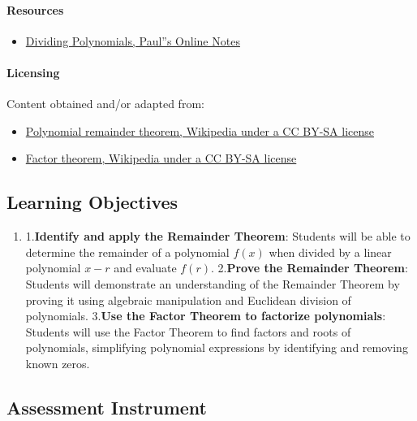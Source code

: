 \paragraph{Resources}

\begin{itemize}
    \item \href{https://tutorial.math.lamar.edu/classes/alg/dividingpolynomials.aspx}{Dividing Polynomials, Paul''s Online Notes}
\end{itemize}

\paragraph{Licensing}

Content obtained and/or adapted from:

\begin{itemize}
    \item \href{https://en.wikipedia.org/wiki/Polynomial_remainder_theorem}{Polynomial remainder theorem, Wikipedia under a CC BY-SA license}
    \item \href{https://en.wikipedia.org/wiki/Factor_theorem}{Factor theorem, Wikipedia under a CC BY-SA license}
\end{itemize}

\subsection{Learning Objectives}

\begin{enumerate}
    \item 1.\textbf{Identify and apply the Remainder Theorem}: Students will be able to determine the remainder of a polynomial $f(x)$ when divided by a linear polynomial $x - r$ and evaluate $f(r)$. 2.\textbf{Prove the Remainder Theorem}: Students will demonstrate an understanding of the Remainder Theorem by proving it using algebraic manipulation and Euclidean division of polynomials. 3.\textbf{Use the Factor Theorem to factorize polynomials}: Students will use the Factor Theorem to find factors and roots of polynomials, simplifying polynomial expressions by identifying and removing known zeros.
\end{enumerate}

\subsection{Assessment Instrument}

